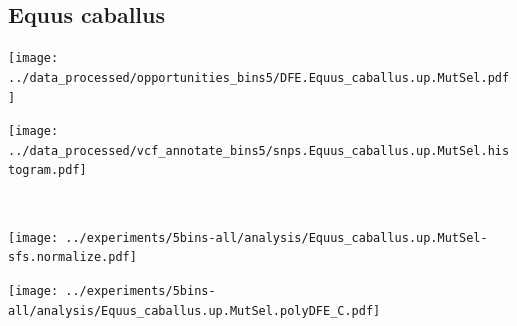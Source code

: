 \subsection{Equus caballus}

\begin{minipage}{0.49\linewidth}
    \texttt{[image: ../data\_processed/opportunities\_bins5/DFE.Equus\_caballus.up.MutSel.pdf]}
\end{minipage}
\begin{minipage}{0.49\linewidth}
    \texttt{[image: ../data\_processed/vcf\_annotate\_bins5/snps.Equus\_caballus.up.MutSel.histogram.pdf]}
\end{minipage}
\\
\begin{minipage}{0.49\linewidth}
    \texttt{[image: ../experiments/5bins-all/analysis/Equus\_caballus.up.MutSel-sfs.normalize.pdf]}
\end{minipage}
\begin{minipage}{0.4\linewidth}
    \texttt{[image: ../experiments/5bins-all/analysis/Equus\_caballus.up.MutSel.polyDFE\_C.pdf]}
\end{minipage}
